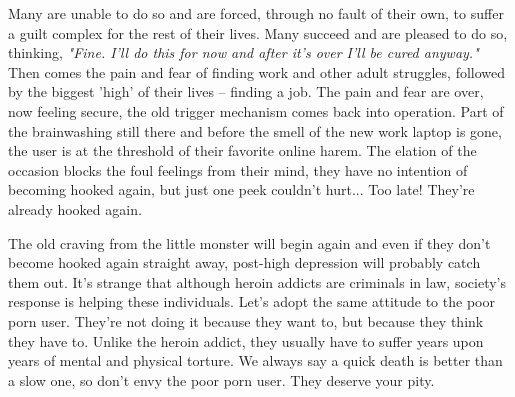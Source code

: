 \documentclass[easypeasy.tex]{subfiles}
\begin{document}
Many are unable to do so and are forced, through no fault of their own, to suffer a guilt complex for the rest of their lives. Many succeed and are pleased to do so, thinking, \textit{"Fine. I'll do this for now and after it's over I'll be cured anyway."} Then comes the pain and fear of finding work and other adult struggles, followed by the biggest 'high' of their lives -- finding a job. The pain and fear are over, now feeling secure, the old trigger mechanism comes back into operation. Part of the brainwashing still there and before the smell of the new work laptop is gone, the user is at the threshold of their favorite online harem. The elation of the occasion blocks the foul feelings from their mind, they have no intention of becoming hooked again, but just one peek couldn't hurt... Too late! They're already hooked again.

The old craving from the little monster will begin again and even if they don't become hooked again straight away, post-high depression will probably catch them out. It's strange that although heroin addicts are criminals in law, society's response is helping these individuals. Let's adopt the same attitude to the poor porn user. They're not doing it because they want to, but because they think they have to. Unlike the heroin addict, they usually have to suffer years upon years of mental and physical torture. We always say a quick death is better than a slow one, so don't envy the poor porn user. They deserve your pity.
\end{document}
